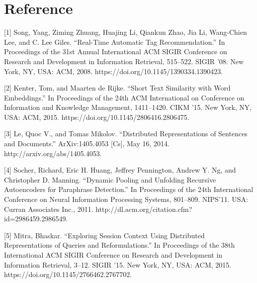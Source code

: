 \documentclass[12pt]{article} %
\begin{document}
\section{Reference}
{\setlength{\parindent}{0cm}
[1] Song, Yang, Ziming Zhuang, Huajing Li, Qiankun Zhao, Jia Li, Wang-Chien Lee, and C. Lee Giles. “Real-Time Automatic Tag Recommendation.” In Proceedings of the 31st Annual International ACM SIGIR Conference on Research and Development in Information Retrieval, 515–522. SIGIR ’08. New York, NY, USA: ACM, 2008. https://doi.org/10.1145/1390334.1390423.

[2] Kenter, Tom, and Maarten de Rijke. “Short Text Similarity with Word Embeddings.” In Proceedings of the 24th ACM International on Conference on Information and Knowledge Management, 1411–1420. CIKM ’15. New York, NY, USA: ACM, 2015. https://doi.org/10.1145/2806416.2806475.

[3] Le, Quoc V., and Tomas Mikolov. “Distributed Representations of Sentences and Documents.” ArXiv:1405.4053 [Cs], May 16, 2014. http://arxiv.org/abs/1405.4053.

[4] Socher, Richard, Eric H. Huang, Jeffrey Pennington, Andrew Y. Ng, and Christopher D. Manning. “Dynamic Pooling and Unfolding Recursive Autoencoders for Paraphrase Detection.” In Proceedings of the 24th International Conference on Neural Information Processing Systems, 801–809. NIPS’11. USA: Curran Associates Inc., 2011. http://dl.acm.org/citation.cfm?id=2986459.2986549.

[5] Mitra, Bhaskar. “Exploring Session Context Using Distributed Representations of Queries and Reformulations.” In Proceedings of the 38th International ACM SIGIR Conference on Research and Development in Information Retrieval, 3–12. SIGIR ’15. New York, NY, USA: ACM, 2015. https://doi.org/10.1145/2766462.2767702.

} 
\end{document}
